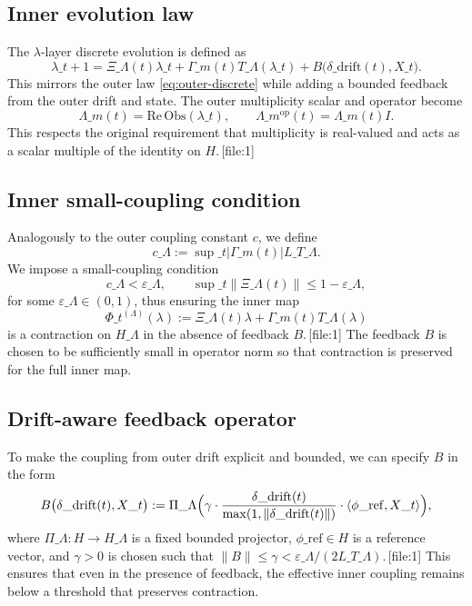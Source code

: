 \documentclass[11pt]{article}
\begin{document}
\subsection{Inner evolution law}

The $\lambda$-layer discrete evolution is defined as
\begin{equation}
\lambda\_{t+1} = \Xi\_\Lambda(t)\lambda\_t + \Gamma\_m(t) T\_\Lambda(\lambda\_t) + B\bigl(\delta\_{\mathrm{drift}}(t), X\_t\bigr).
\label{eq:inner-discrete}
\end{equation}
This mirrors the outer law \eqref{eq:outer-discrete} while adding a bounded feedback from the outer drift and state. The outer multiplicity scalar and operator become
\begin{equation}
\Lambda\_m(t) = \mathrm{Re}\,\mathrm{Obs}(\lambda\_t), \qquad
\Lambda\_m^{\mathrm{op}}(t) = \Lambda\_m(t)I.
\label{eq:lambda-observable}
\end{equation}
This respects the original requirement that multiplicity is real-valued and acts as a scalar multiple of the identity on $H$.\,[file:1]

\subsection{Inner small-coupling condition}

Analogously to the outer coupling constant $c$, we define
\[
c\_\Lambda := \sup\_t |\Gamma\_m(t)| L\_{T\_\Lambda}.
\]
We impose a small-coupling condition
\[
c\_\Lambda < \varepsilon\_\Lambda, \qquad \sup\_t\|\Xi\_\Lambda(t)\|\le 1-\varepsilon\_\Lambda,
\]
for some $\varepsilon\_\Lambda\in(0,1)$, thus ensuring the inner map
\[
\Phi\_t^{(\Lambda)}(\lambda) := \Xi\_\Lambda(t)\lambda + \Gamma\_m(t) T\_\Lambda(\lambda)
\]
is a contraction on $H\_\Lambda$ in the absence of feedback $B$.\,[file:1] The feedback $B$ is chosen to be sufficiently small in operator norm so that contraction is preserved for the full inner map.

\subsection{Drift-aware feedback operator}

To make the coupling from outer drift explicit and bounded, we can specify $B$ in the form
\[
B\bigl(\delta\_{\mathrm{drift}}(t), X\_t\bigr) := \Pi\_\Lambda\Bigl(\gamma \cdot \frac{\delta\_{\mathrm{drift}}(t)}{\max(1,\|\delta\_{\mathrm{drift}}(t)\|)} \cdot \langle\phi\_{\mathrm{ref}}, X\_t\rangle \Bigr),
\]
where $\Pi\_\Lambda:H\to H\_\Lambda$ is a fixed bounded projector, $\phi\_{\mathrm{ref}}\in H$ is a reference vector, and $\gamma>0$ is chosen such that $\|B\|\le\gamma < \varepsilon\_\Lambda/(2L\_{T\_\Lambda})$.\,[file:1] This ensures that even in the presence of feedback, the effective inner coupling remains below a threshold that preserves contraction.
\end{document}
